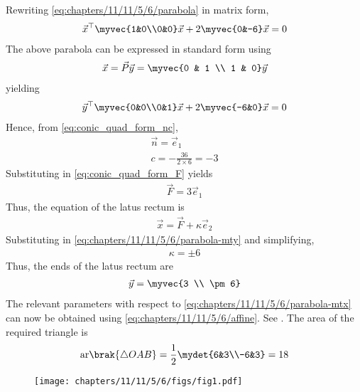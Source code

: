 		Rewriting \eqref{eq:chapters/11/11/5/6/parabola} in matrix form,
    \begin{align}
        \vec{x}^\top\myvec{1&0\\0&0}\vec{x} + 2\myvec{0&-6}\vec{x} = 0
        \label{eq:chapters/11/11/5/6/parabola-mtx}
    \end{align}
    The above parabola can be  expressed in standard form using 
\begin{align}
	\vec{x} = \vec{P}\vec{y} = \myvec{0 & 1 \\ 1 & 0}\vec{y}
        \label{eq:chapters/11/11/5/6/affine}
\end{align}
yielding
    \begin{align}
        \vec{y}^\top\myvec{0&0\\0&1}\vec{x} + 2\myvec{-6&0}\vec{x} = 0
        \label{eq:chapters/11/11/5/6/parabola-mty}
    \end{align}
    Hence, 
    from
\eqref{eq:conic_quad_form_nc}, 
    \begin{align}
	    \vec{n} = \vec{e}_1
        \label{eq:chapters/11/11/5/6/n}
	\\
	    c = -\frac{36}{2\times 6} = -3
    \end{align}
    Substituting in 
  \eqref{eq:conic_quad_form_F} 
  yields
    \begin{align}
        \vec{F} = 3\vec{e}_1
    \end{align}
    Thus, the equation of the latus rectum is
\begin{align}
        \vec{x} = \vec{F} + \kappa \vec{e}_2
        \label{eq:chapters/11/11/5/6/x-general}
    \end{align}
        Substituting in \eqref{eq:chapters/11/11/5/6/parabola-mty} and simplifying,
    \begin{align}
\kappa = \pm 6
        \label{eq:chapters/11/11/5/6/x-latus}
    \end{align}
    Thus, the ends of the latus rectum are
    \begin{align}
        \vec{y} = \myvec{3 \\ \pm 6}
    \end{align}
    The relevant parameters with respect to 
        \eqref{eq:chapters/11/11/5/6/parabola-mtx}
	can now be obtained using 
        \eqref{eq:chapters/11/11/5/6/affine}.
See .
The area of the required triangle is
    \begin{align}
        \textrm{ar}\brak{\triangle OAB} = \frac{1}{2}\mydet{6&3\\-6&3} = 18 
    \end{align}
    \begin{figure}[H]
        \centering
        \texttt{[image: chapters/11/11/5/6/figs/fig1.pdf]}
        \caption{}
        \label{fig:chapters/11/11/5/6/parabola}
    \end{figure}
